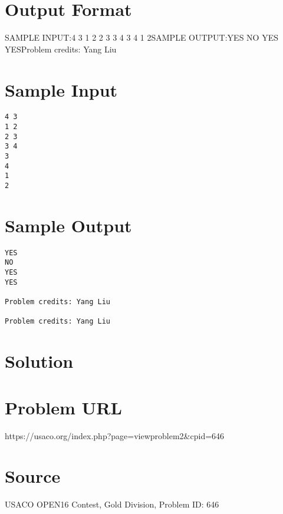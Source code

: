 \documentclass[12pt]{article}
\begin{document}
\section*{Output Format}
SAMPLE INPUT:4 3
1 2
2 3
3 4
3
4
1
2SAMPLE OUTPUT:YES
NO
YES
YESProblem credits: Yang Liu

\section*{Sample Input}
\begin{verbatim}
4 3
1 2
2 3
3 4
3
4
1
2
\end{verbatim}

\section*{Sample Output}
\begin{verbatim}
YES
NO
YES
YES

Problem credits: Yang Liu

Problem credits: Yang Liu
\end{verbatim}

\section*{Solution}


\section*{Problem URL}
https://usaco.org/index.php?page=viewproblem2&cpid=646

\section*{Source}
USACO OPEN16 Contest, Gold Division, Problem ID: 646
\end{document}
